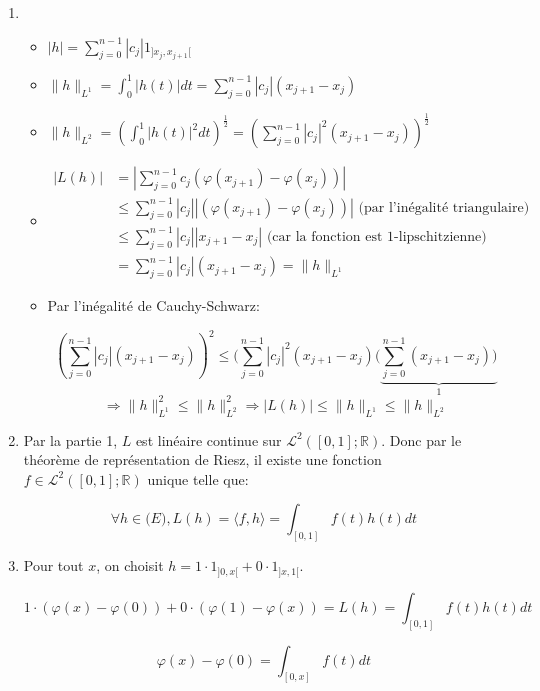 \documentclass[10pt,a4paper,oneside]{article}
\newenvironment{solution}[1][Solution]{\begin{trivlist}
\item[\hskip \labelsep {\bfseries #1}]}{\end{trivlist}}
\begin{document}
\begin{solution}
\begin{enumerate}
\item
\begin{itemize}
\item
$|h| = \sum_{j = 0}^{n - 1}|c_j| 1_{]x_j,x_{j + 1}[}$

\item
$\| h \|_{L^1} = \int_{0}^1 |h(t)|dt = \sum_{j = 0}^{n - 1} |c_j|(x_{j + 1}-x_j)$

\item
$\| h \|_{L^2} = (\int_{0}^1 |h(t)|^2 dt)^{\frac{1}{2}} = (\sum_{j = 0}^{n - 1} |c_j|^2(x_{j + 1}-x_j))^{\frac{1}{2}}$

\item
\begin{align}
|L(h)| &= |\sum_{j = 0}^{n - 1} c_j (\varphi(x_{j + 1}) - \varphi(x_j))| \nonumber \\
&\leq  \sum_{j = 0}^{n - 1} |c_j| |(\varphi(x_{j + 1}) - \varphi(x_j))| \text{ (par l'inégalité triangulaire)} \nonumber \\
&\leq \sum_{j = 0}^{n - 1} |c_j| |x_{j + 1} - x_{j}| \nonumber \text{ (car la fonction est 1-lipschitzienne)} \nonumber \\
&= \sum_{j = 0}^{n - 1} |c_j| (x_{j + 1} - x_{j}) = \| h \|_{L^1} \nonumber
\end{align}

\item
Par l'inégalité de Cauchy-Schwarz:

\[ (\sum_{j=0}^{n - 1} |c_j|(x_{j + 1} - x_j))^2 \leq (\sum_{j = 0}^{n - 1} |c_j|^2(x_{j + 1} - x_j)(\underbrace{ \sum_{j = 0}^{n - 1}(x_{j + 1}-x_j)) }_{1}\]
\[ \Rightarrow \| h \|_{L^1}^2 \leq \| h \|_{L^2}^2 \Rightarrow |L(h)| \leq \| h \|_{L^1} \leq \| h \|_{L^2} \]
\end{itemize}

\item
Par la partie 1, $L$ est linéaire continue sur $\mathcal{L}^2([0,1];\mathbb{R})$. Donc par le théorème de représentation de Riesz, il existe une fonction $f \in \mathcal{L}^2([0,1];\mathbb{R})$ unique telle que:

\[ \forall h \in \mathcal(E), L(h) = \langle f,h \rangle = \int_{[0,1]} f(t)h(t)dt \]

\item
Pour tout $x$, on choisit $h = 1 \cdot 1_{]0,x[} + 0 \cdot 1_{]x,1[}$.

\[ 1 \cdot (\varphi(x) - \varphi(0)) + 0 \cdot (\varphi(1) - \varphi(x)) = L(h) = \int_{[0,1]} f(t)h(t)dt \]

\[ \varphi(x) - \varphi(0) = \int_{[0,x]} f(t)dt \]

\end{enumerate}
\end{solution}
\end{document}
